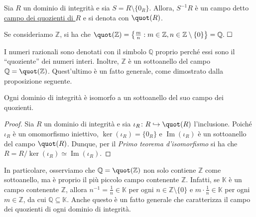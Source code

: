 \begin{defn}[]{}
Sia $R$ un dominio di integrità e sia $S=R\setminus \{0_R\}$. Allora, $S^{-1}R$ è un campo detto \underline{campo dei quozienti di $R$} e si denota con $\quot(R)$.
\end{defn}

\begin{exm}Se consideriamo $\mathbb{Z}$, si ha che $\quot(\mathbb{Z})=\left\{\frac{m}{n}: m\in \mathbb{Z}, n\in\mathbb{Z}\setminus\{0\}\right\}=\mathbb{Q}. \ \square$\end{exm}

\noindent I numeri razionali sono denotati con il simbolo $\mathbb{Q}$ proprio perché essi sono il ``quoziente''  dei numeri interi. Inoltre, $\mathbb{Z}$ è un sottoanello del campo $\mathbb{Q}=\quot(\mathbb{Z})$. Quest'ultimo è un fatto generale, come dimostrato dalla proposizione seguente.

\begin{prop}[1.7.4]{}
Ogni dominio di integrità è isomorfo a un sottoanello del suo campo dei quozienti.
\end{prop}
\vspace{-4mm}
\begin{proof}
Sia $R$ un dominio di integrità e sia $\iota_R\colon R\hookrightarrow \quot(R)$ l'inclusione. Poiché $\iota_R$ è un omomorfismo iniettivo, $\ker(\iota_R)=\{0_R\}$ e $\operatorname{Im}(\iota_R)$ è un sottoanello del campo $\quot(R)$. Dunque, per il \emph{Primo teorema d'isomorfismo} si ha che $R=R/\ker(\iota_R)\simeq \operatorname{Im}(\iota_R)$.
\end{proof}

\noindent In particolare, osserviamo che $\mathbb{Q}=\quot(\mathbb{Z})$ non solo contiene $\mathbb{Z}$ come sottoanello, ma è proprio il più piccolo campo contenente $\mathbb{Z}$. Infatti, se $\mathbb{K}$ è un campo contenente $\mathbb{Z}$, allora $n^{-1}=\frac{1}{n}\in \mathbb{K}$ per ogni $n\in \mathbb{Z}\setminus\{0\}$ e $m\cdot \frac{1}{n}\in \mathbb{K}$ per ogni $m\in \mathbb{Z}$, da cui $\mathbb{Q}\subseteq \mathbb{K}$. Anche questo è un fatto generale che caratterizza il campo dei quozienti di ogni dominio di integrità.

